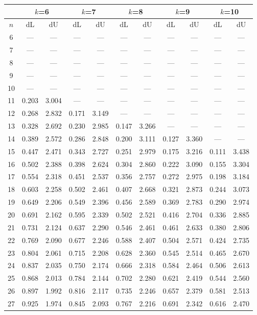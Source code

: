 \documentclass[12pt]{article}
\begin{document}
\begin{table}
\begin{center}
{\footnotesize
\begin{tabular}{|c|c|c|c|c|c|c|c|c|c|c|}
	\hline
	& \multicolumn{2}{c|}{$k$=6}& \multicolumn{2}{c|}{$k$=7} &
	\multicolumn{2}{c|}{$k$=8} & \multicolumn{2}{c|}{$k$=9}&
	\multicolumn{2}{c|}{$k$=10}\\ \hline
	$n$ & dL& dU& dL &dU &dL &dU& dL& dU& dL& dU\\ \hline
	6&---&---&---&---&---&---&---&---&---&---\\
	7&---&---&---&---&---&---&---&---&---&---\\
	8&---&---&---&---&---&---&---&---&---&---\\
	9&---&---&---&---&---&---&---&---&---&---\\
	10&---&---&---&---&---&---&---&---&---&---\\
	11&0.203&3.004&---&---&---&---&---&---&---&---\\
	12&0.268&2.832&0.171&3.149&---&---&---&---&---&---\\
	13&0.328&2.692&0.230&2.985&0.147&3.266&---&---&---&---\\
	14&0.389&2.572&0.286&2.848&0.200&3.111&0.127&3.360&---&---\\
	15&0.447&2.471&0.343&2.727&0.251&2.979&0.175&3.216&0.111&3.438\\
	16&0.502&2.388&0.398&2.624&0.304&2.860&0.222&3.090&0.155&3.304\\
	17&0.554&2.318&0.451&2.537&0.356&2.757&0.272&2.975&0.198&3.184\\
	18&0.603&2.258&0.502&2.461&0.407&2.668&0.321&2.873&0.244&3.073\\
	19&0.649&2.206&0.549&2.396&0.456&2.589&0.369&2.783&0.290&2.974\\
	20&0.691&2.162&0.595&2.339&0.502&2.521&0.416&2.704&0.336&2.885\\
	21&0.731&2.124&0.637&2.290&0.546&2.461&0.461&2.633&0.380&2.806\\
	22&0.769&2.090&0.677&2.246&0.588&2.407&0.504&2.571&0.424&2.735\\
	23&0.804&2.061&0.715&2.208&0.628&2.360&0.545&2.514&0.465&2.670\\
	24&0.837&2.035&0.750&2.174&0.666&2.318&0.584&2.464&0.506&2.613\\
	25&0.868&2.013&0.784&2.144&0.702&2.280&0.621&2.419&0.544&2.560\\
	26&0.897&1.992&0.816&2.117&0.735&2.246&0.657&2.379&0.581&2.513\\
	27&0.925&1.974&0.845&2.093&0.767&2.216&0.691&2.342&0.616&2.470\\

\end{tabular}}
\end{center}
\end{table}
\end{document}

